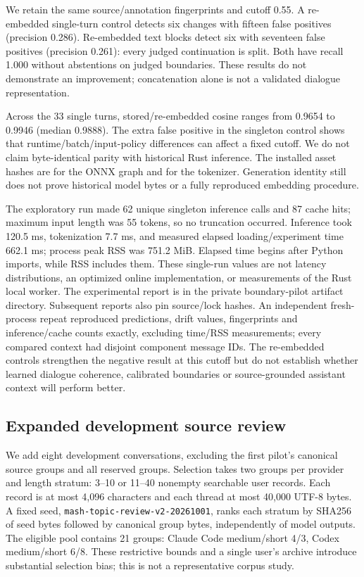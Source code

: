 \documentclass[11pt]{article}
\begin{document}
We retain the same source/annotation fingerprints and cutoff 0.55. A re-embedded
single-turn control detects six changes with fifteen false positives (precision
0.286). Re-embedded text blocks detect six with seventeen false positives
(precision 0.261): every judged continuation is split. Both have recall 1.000
without abstentions on judged boundaries. These results do not demonstrate an
improvement; concatenation alone is not a validated dialogue representation.

Across the 33 single turns, stored/re-embedded cosine ranges from 0.9654 to 0.9946
(median 0.9888). The extra false positive in the singleton control shows that
runtime/batch/input-policy differences can affect a fixed cutoff. We do not claim
byte-identical parity with historical Rust inference. The installed asset hashes
are 
for the ONNX graph and
for the tokenizer. Generation identity still does not prove historical model
bytes or a fully reproduced embedding procedure.

The exploratory run made 62 unique singleton inference calls and 87 cache hits;
maximum input length was 55 tokens, so no truncation occurred. Inference took
120.5 ms, tokenization 7.7 ms, and measured elapsed loading/experiment time
662.1 ms; process peak RSS was 751.2 MiB. Elapsed time begins after Python imports,
while RSS includes them. These single-run values are not latency distributions,
an optimized online implementation, or measurements of the Rust local worker.
The experimental report is  in the private
boundary-pilot artifact directory. Subsequent reports also pin source/lock hashes.
An independent fresh-process repeat reproduced predictions, drift values,
fingerprints and inference/cache counts exactly, excluding time/RSS measurements;
every compared context had disjoint component message IDs.
The re-embedded controls strengthen the negative result at this cutoff but do
not establish whether learned dialogue coherence, calibrated boundaries or
source-grounded assistant context will perform better.

\subsection{Expanded development source review}
We add eight development conversations, excluding the first pilot's canonical
source groups and all reserved groups. Selection takes two groups per provider
and length stratum: 3--10 or 11--40 nonempty searchable user records. Each record
is at most 4,096 characters and each thread at most 40,000 UTF-8 bytes. A fixed
seed, \texttt{mash-topic-review-v2-20261001}, ranks each stratum by SHA256 of seed
bytes followed by canonical group bytes, independently of model outputs.
The eligible pool contains 21 groups: Claude Code medium/short 4/3, Codex
medium/short 6/8. These restrictive bounds and a single user's archive introduce
substantial selection bias; this is not a representative corpus study.
\end{document}
